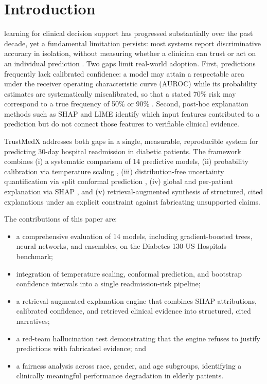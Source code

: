 \documentclass[12pt,onecolumn,journal]{IEEEtran}
\begin{document}
\IEEEpeerreviewmaketitle

\section{Introduction}
\label{sec:introduction}
 learning for clinical decision support has progressed substantially over the past decade, yet a fundamental limitation persists: most systems report discriminative accuracy in isolation, without measuring whether a clinician can trust or act on an individual prediction \cite{strack2014impact}. Two gaps limit real-world adoption. First, predictions frequently lack calibrated confidence: a model may attain a respectable area under the receiver operating characteristic curve (AUROC) while its probability estimates are systematically miscalibrated, so that a stated 70\% risk may correspond to a true frequency of 50\% or 90\% \cite{guo2017calibration}. Second, post-hoc explanation methods such as SHAP \cite{lundberg2017unified} and LIME \cite{ribeiro2016should} identify which input features contributed to a prediction but do not connect those features to verifiable clinical evidence.

TrustMedX addresses both gaps in a single, measurable, reproducible system for predicting 30-day hospital readmission in diabetic patients. The framework combines (i) a systematic comparison of 14 predictive models, (ii) probability calibration via temperature scaling \cite{guo2017calibration}, (iii) distribution-free uncertainty quantification via split conformal prediction \cite{vovk2005algorithmic,angelopoulos2021gentle}, (iv) global and per-patient explanation via SHAP \cite{lundberg2017unified}, and (v) retrieval-augmented synthesis of structured, cited explanations \cite{lewis2020retrieval} under an explicit constraint against fabricating unsupported claims.

The contributions of this paper are:
\begin{itemize}
    \item a comprehensive evaluation of 14 models, including gradient-boosted trees, neural networks, and ensembles, on the Diabetes 130-US Hospitals benchmark;
    \item integration of temperature scaling, conformal prediction, and bootstrap confidence intervals into a single readmission-risk pipeline;
    \item a retrieval-augmented explanation engine that combines SHAP attributions, calibrated confidence, and retrieved clinical evidence into structured, cited narratives;
    \item a red-team hallucination test demonstrating that the engine refuses to justify predictions with fabricated evidence; and
    \item a fairness analysis across race, gender, and age subgroups, identifying a clinically meaningful performance degradation in elderly patients.
\end{itemize}
\end{document}
